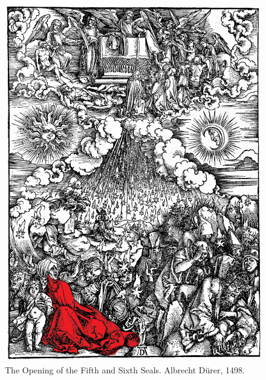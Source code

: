   \begin{figure}[p]
  	\centering
  	\includegraphics[width=\linewidth]{Durer/Durer_Sixth_Seal.jpg}
  	\caption[The Opening of the Fifth and Sixth Seals]{The Opening of the Fifth and Sixth Seals. Albrecht Dürer, 1498.}
  \end{figure}
